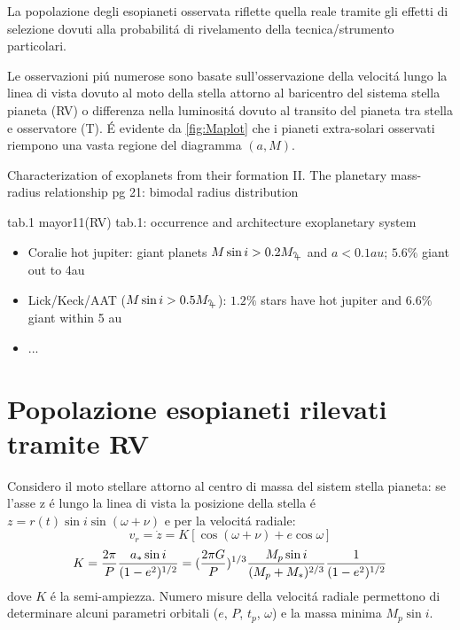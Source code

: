 \begin{workout}
La popolazione degli esopianeti osservata riflette quella reale tramite gli effetti di selezione dovuti alla probabilit\'a di rivelamento della tecnica/strumento particolari.
\end{workout}

Le osservazioni pi\'u numerose sono basate sull'osservazione della velocit\'a lungo la linea di vista dovuto al moto della stella attorno al baricentro del sistema stella pianeta (RV) o differenza nella luminosit\'a dovuto al transito del pianeta tra stella e osservatore (T). \'E evidente da \ref{fig:Maplot} che i pianeti extra-solari osservati riempono una vasta regione del diagramma $(a,M)$.

\begin{workout}
Characterization of exoplanets from their formation II. The planetary mass-radius relationship pg 21: bimodal radius distribution
\end{workout}

\begin{workout}
tab.1 mayor11(RV)
tab.1: occurrence and architecture exoplanetary system 
\end{workout}

\begin{workout}
\begin{itemize}
\item Coralie hot jupiter: giant planets $M\sin{i}>0.2\mjupiter$ and $a<0.1au$; $5.6\%$ giant out to 4au
\item Lick/Keck/AAT ($M\sin{i}>0.5\mjupiter$): $1.2\%$ stars have hot jupiter and $6.6\%$ giant within 5 au
\item ...
\end{itemize}
\end{workout}

\vspace{5cm}

\section{Popolazione esopianeti rilevati tramite RV}

Considero il moto stellare attorno al centro di massa del sistem stella pianeta:
se l'asse z \'e lungo la linea di vista la posizione della stella \'e $z=r(t)\sin{i}\sin{(\omega+\nu)}$ e per la velocit\'a radiale:
\begin{equation}
v_r=\dot{z}=K[\cos{(\omega+\nu)}+e\cos{\omega}]\label{eq:vrsignal}
\end{equation}
\begin{equation}
K=\frac{2\pi}{P}\frac{a_*\sin{i}}{(1-e^2)^{1/2}}=(\frac{2\pi G}{P})^{1/3}\frac{M_p\sin{i}}{(M_p+M_*)^{2/3}}\frac{1}{(1-e^2)^{1/2}}
\end{equation}
dove $K$ \'e la semi-ampiezza.
Numero misure della velocit\'a radiale permettono di determinare alcuni parametri orbitali ($e$, $P$, $t_p$, $\omega$) e la massa minima $M_p\sin{i}$.


